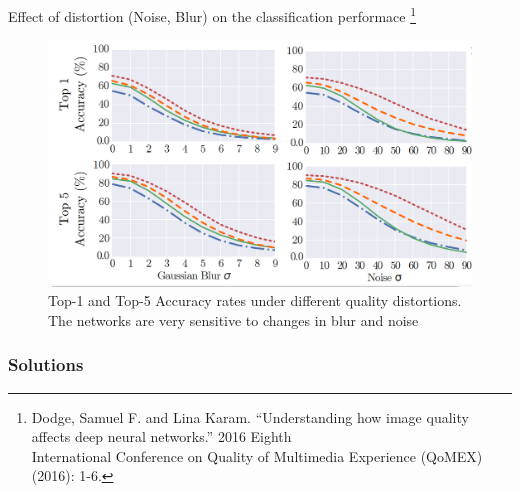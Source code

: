 \documentclass{libs/ufc_format}
\newcommand{\tikzmark}[1]{\tikz[overlay,remember picture] \node (#1) {};}
\begin{document}
\begin{frame}{\small Effect of distortion (Noise, Blur) on the classification performace \footnote[frame]{\tiny Dodge, Samuel F. and Lina Karam. “Understanding how image quality affects deep neural networks.” 2016 Eighth \\ International Conference on Quality of Multimedia Experience (QoMEX) (2016): 1-6.}}
    \begin{figure}
        \centering
        \includegraphics[scale=0.2]{libs/acceffect.png}
        \vspace{0.4cm}
        \caption{Top-1 and Top-5 Accuracy rates under different quality distortions. The networks are very sensitive to changes in blur and noise}
        \label{fig:challenge3}
    \end{figure}

\end{frame}


\subsubsection{Solutions}

\end{document}
